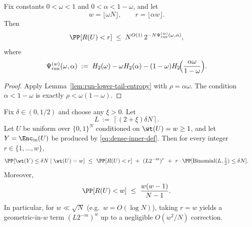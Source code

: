 \begin{corollary}
\label{cor:run-lower-tail-alpha}
Fix constants \(0<\omega<1\) and \(0<\alpha<1-\omega\), and let
\[
w=\lfloor \omega N\rfloor,
\qquad
r=\lfloor \alpha w\rfloor.
\]
Then
\begin{equation}
\label{eq:run-lower-tail-alpha}
\PP[R(U)<r]
\;\le\;
N^{O(1)}\,2^{-N\Psi_{\mathrm{run}}^{(w)}(\omega,\alpha)},
\end{equation}
where
\begin{equation}
\label{eq:run-rate-function-alpha}
\Psi_{\mathrm{run}}^{(w)}(\omega,\alpha)
\;:=\;
H_2(\omega)
- \omega H_2(\alpha)
- (1-\omega)H_2\!\Bigl(\frac{\alpha\omega}{1-\omega}\Bigr).
\end{equation}
\end{corollary}

\begin{proof}
Apply Lemma~\ref{lem:run-lower-tail-entropy} with \(\rho=\alpha\omega\).
The condition \(\alpha<1-\omega\) is exactly \(\rho<\omega(1-\omega)\).
\end{proof}

\begin{lemma}
\label{lem:dense-forced-termination}
Fix $\delta\in(0,1/2)$ and choose any $\xi>0$. Let
\[
L\ :=\ \left\lceil (2+\xi)\delta N \right\rceil.
\]
Let $U$ be uniform over $\{0,1\}^N$ conditioned on $\wt(U)=w\ge 1$, and let $Y=\Enc_{\mathrm{in}}(U)$ be produced by
\eqref{eq:dense-inner-def}. Then for every integer $r\in\{1,\dots,w\}$,
\begin{equation}
\label{eq:dense-forced-termination}
\PP[\wt(Y)\le \delta N \mid \wt(U)=w]
\ \le\
\PP[R(U)<r]\ +\ (L2^{-m})^{r}\ +\ r\cdot \PP[\mathrm{Binomial}(L,\tfrac12)\le \delta N].
\end{equation}
Moreover,
\begin{equation}
\label{eq:runs-adjacent-bound}
\PP[R(U)<w]\ \le\ \frac{w(w-1)}{N-1}.
\end{equation}
In particular, for $w\ll \sqrt{N}$ (e.g.\ $w=O(\log N)$), taking $r=w$ yields a geometric-in-$w$ term
$(L2^{-m})^w$ up to a negligible $O(w^2/N)$ correction.
\end{lemma}

